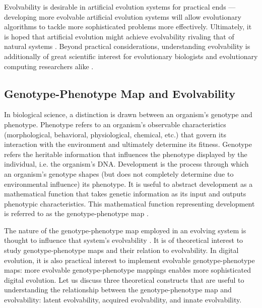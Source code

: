 

Evolvability is desirable in artificial evolution systems for practical ends --- developing more evolvable artificial evolution systems will allow evolutionary algorithms to tackle more sophisticated problems more effectively.
Ultimately, it is hoped that artificial evolution might achieve evolvability rivaling that of natural systems \cite{mengistu2016evolvability}.
Beyond practical considerations, understanding evolvability is additionally of great scientific interest for evolutionary biologists and evolutionary computing researchers alike \cite{mengistu2016evolvability, pigliucci2008evolvability}.

\subsection{Genotype-Phenotype Map and Evolvability}

In biological science, a distinction is drawn between an organism's genotype and phenotype.
Phenotype refers to an organism's observable characteristics (morphological, behavioral, physiological, chemical, etc.) that govern its interaction with the environment and ultimately determine its fitness.
Genotype refers the heritable information that influences the phenotype displayed by the individual, i.e. the organism's DNA.
Development is the process through which an organism's genotype shapes (but does not completely determine due to environmental influence) its phenotype.
It is useful to abstract development as a mathematical function that takes genetic information as its input and outputs phenotypic characteristics.
This mathematical function representing development is referred to as the genotype-phenotype map \cite{alberch1991genes}.

The nature of the genotype-phenotype map employed in an evolving system is thought to influence that system's evolvability \cite{pigliucci2010genotype}.
It is of theoretical interest to study genotype-phenotype maps and their relation to evolvability.
In digital evolution, it is also practical interest to implement evolvable genotype-phenotype maps: more evolvable genotype-phenotype mappings enables more sophisticated digital evolution.
Let us discuss three theoretical constructs that are useful to understanding the relationship between the genotype-phenotype map and evolvability: latent evolvability, acquired evolvability, and innate evolvability.


